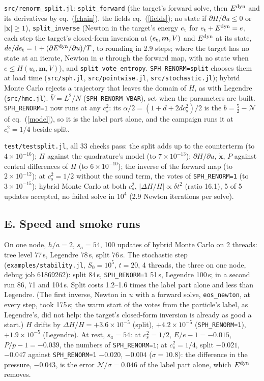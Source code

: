 \documentclass[11pt,aps,preprint,nofootinbib,superscriptaddress,tightenlines]{revtex4-2}
\def\Eq#1{eq.~(\ref{#1})}
\begin{document}
\nolinkurl{src/renorm_split.jl}: \texttt{split\_forward} (the target's forward solve, then $E^{\rm dyn}$ and its derivatives by \Eq{chain}, the fields
\Eq{fields}; no state if $\partial H/\partial u\le0$ or $|\dot{\bm x}|\ge1$), \texttt{split\_inverse} (Newton in the target's energy $e_{\rm t}$ for $e_{\rm t}+E^{\rm dyn}=e$, each step the
target's closed-form inversion at $(e_{\rm t},\bm m,V)$ and $E^{\rm dyn}$ at its state, $de/de_{\rm t}=1+(\partial E^{\rm dyn}/\partial u)/T$, to rounding in 2.9 steps;
where the target has no state at an iterate, Newton in $u$ through the forward map, with no state when $e\le H(u_b,\bm m,V)$), and \texttt{split\_vote\_entropy}.  \texttt{SPH\_RENORM=split} chooses them at load time (\nolinkurl{src/sph.jl}, \nolinkurl{src/pointwise.jl},
\nolinkurl{src/stochastic.jl}); hybrid Monte Carlo rejects a trajectory that leaves the domain of $H$, as with Legendre (\nolinkurl{src/hmc.jl}).  $\bar V=L^2/N$
(\texttt{SPH\_RENORM\_VBAR}), set when the parameters are built.  \texttt{SPH\_RENORM=1} now runs at any $c_s^2$: its $\alpha/2=(1+d+2dc_s^2)/2$ is the $b=\tfrac52-\mathcal N$
of \Eq{model}, so it is the label part alone, and the campaign runs it at $c_s^2=1/4$ beside split.

\nolinkurl{test/testsplit.jl}, all 33 checks pass: the split adds up to the counterterm (to $4\times10^{-16}$); $H$ against the quadrature's model (to
$7\times10^{-13}$); $\partial H/\partial u$, $\dot{\bm x}$, $P$ against central differences of $H$ (to $6\times10^{-10}$); the inverse of the forward map (to
$2\times10^{-12}$); at $c_s^2=1/2$ without the sound term, the votes of \texttt{SPH\_RENORM=1} (to $3\times10^{-15}$); hybrid Monte Carlo at both $c_s^2$,
$|\Delta H/H|\propto\delta t^2$ (ratio 16.1), 5 of 5 updates accepted, no failed solve in $10^4$ (2.9 Newton iterations per solve).

\subsection{E. Speed and smoke runs}

On one node, $h/a=2$, $s_a=54$, 100 updates of hybrid Monte Carlo on 2 threads: tree level 77\,s, Legendre 78\,s, split 76\,s.  The stochastic step
(\nolinkurl{examples/stability.jl}, $S_0=10^5$, $t=20$, 4 threads, the three on one node, debug job 61869262): split 84\,s, \texttt{SPH\_RENORM=1} 51\,s, Legendre
100\,s; in a second run 86, 71 and 104\,s.  Split costs 1.2--1.6 times the label part alone and less than Legendre.  (The first inverse, Newton in $u$ with a
forward solve, \texttt{eos\_newton}, at every step, took 175\,s; the warm start of the votes from the particle's label, as Legendre's, did not help: the
target's closed-form inversion is already as good a start.)  $H$ drifts by $\Delta H/H=+3.6\times10^{-5}$ (split), $+4.2\times10^{-5}$ (\texttt{SPH\_RENORM=1}),
$+1.9\times10^{-5}$ (Legendre).  At rest, $s_a=54$: at $c_s^2=1/2$, $E/e-1=-0.015$, $P/p-1=-0.039$, the numbers of
\texttt{SPH\_RENORM=1}; at $c_s^2=1/4$, split $-0.021$, $-0.047$ against \texttt{SPH\_RENORM=1} $-0.020$, $-0.004$ ($\sigma=10.8$): the difference in the
pressure, $-0.043$, is the error $\mathcal N/\sigma=0.046$ of the label part alone, which $E^{\rm dyn}$ removes.
\end{document}
